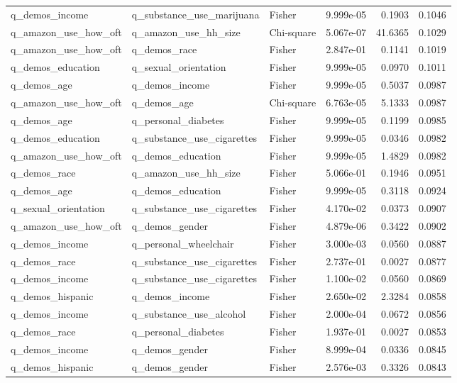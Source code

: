 \begin{longtable}[t]{llllrr}
q\_demos\_income & q\_substance\_use\_marijuana & Fisher & 9.999e-05 & 0.1903 & 0.1046\\
\addlinespace
q\_amazon\_use\_how\_oft & q\_amazon\_use\_hh\_size & Chi-square & 5.067e-07 & 41.6365 & 0.1029\\
q\_amazon\_use\_how\_oft & q\_demos\_race & Fisher & 2.847e-01 & 0.1141 & 0.1019\\
q\_demos\_education & q\_sexual\_orientation & Fisher & 9.999e-05 & 0.0970 & 0.1011\\
q\_demos\_age & q\_demos\_income & Fisher & 9.999e-05 & 0.5037 & 0.0987\\
q\_amazon\_use\_how\_oft & q\_demos\_age & Chi-square & 6.763e-05 & 5.1333 & 0.0987\\
\addlinespace
q\_demos\_age & q\_personal\_diabetes & Fisher & 9.999e-05 & 0.1199 & 0.0985\\
q\_demos\_education & q\_substance\_use\_cigarettes & Fisher & 9.999e-05 & 0.0346 & 0.0982\\
q\_amazon\_use\_how\_oft & q\_demos\_education & Fisher & 9.999e-05 & 1.4829 & 0.0982\\
q\_demos\_race & q\_amazon\_use\_hh\_size & Fisher & 5.066e-01 & 0.1946 & 0.0951\\
q\_demos\_age & q\_demos\_education & Fisher & 9.999e-05 & 0.3118 & 0.0924\\
\addlinespace
q\_sexual\_orientation & q\_substance\_use\_cigarettes & Fisher & 4.170e-02 & 0.0373 & 0.0907\\
q\_amazon\_use\_how\_oft & q\_demos\_gender & Fisher & 4.879e-06 & 0.3422 & 0.0902\\
q\_demos\_income & q\_personal\_wheelchair & Fisher & 3.000e-03 & 0.0560 & 0.0887\\
q\_demos\_race & q\_substance\_use\_cigarettes & Fisher & 2.737e-01 & 0.0027 & 0.0877\\
q\_demos\_income & q\_substance\_use\_cigarettes & Fisher & 1.100e-02 & 0.0560 & 0.0869\\
\addlinespace
q\_demos\_hispanic & q\_demos\_income & Fisher & 2.650e-02 & 2.3284 & 0.0858\\
q\_demos\_income & q\_substance\_use\_alcohol & Fisher & 2.000e-04 & 0.0672 & 0.0856\\
q\_demos\_race & q\_personal\_diabetes & Fisher & 1.937e-01 & 0.0027 & 0.0853\\
q\_demos\_income & q\_demos\_gender & Fisher & 8.999e-04 & 0.0336 & 0.0845\\
q\_demos\_hispanic & q\_demos\_gender & Fisher & 2.576e-03 & 0.3326 & 0.0843\\

\end{longtable}
